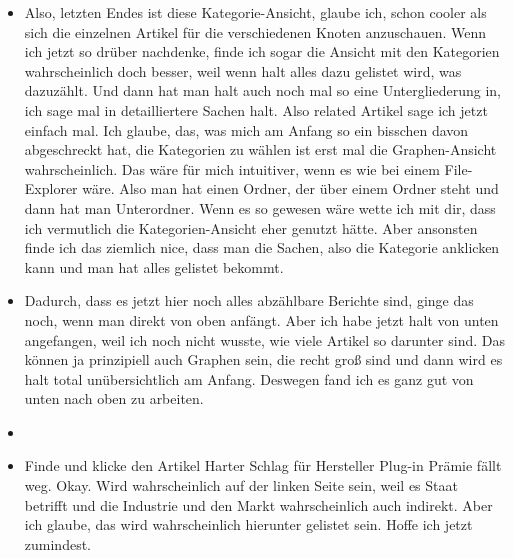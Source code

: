 {\begin{itemize}[]
                  Also, dass du beschrieben hast, dass du eher diese Bottom-to-Top-Ansicht bevorzugst, also, dass du eher auf die Artikel klickst.
                  Später hast du dann aber auch die Top-to-Bottom-Ansicht ausprobiert.
                  Kannst du mir dazu vielleicht noch etwas erzählen?
            \item {} Also, letzten Endes ist diese Kategorie-Ansicht, glaube ich, schon cooler als sich die einzelnen Artikel für die verschiedenen Knoten anzuschauen.
                  Wenn ich jetzt so drüber nachdenke, finde ich sogar die Ansicht mit den Kategorien wahrscheinlich doch besser, weil wenn halt alles dazu gelistet wird, was dazuzählt.
                  Und dann hat man halt auch noch mal so eine Untergliederung in, ich sage mal in detailliertere Sachen halt. Also related Artikel sage ich jetzt einfach mal.
                  Ich glaube, das, was mich am Anfang so ein bisschen davon abgeschreckt hat, die Kategorien zu wählen ist erst mal die Graphen-Ansicht wahrscheinlich.
                  Das wäre für mich intuitiver, wenn es wie bei einem File-Explorer wäre.
                  Also man hat einen Ordner, der über einem Ordner steht und dann hat man Unterordner.
                  Wenn es so gewesen wäre wette ich mit dir, dass ich vermutlich die Kategorien-Ansicht eher genutzt hätte.
                  Aber ansonsten finde ich das ziemlich nice, dass man die Sachen, also die Kategorie anklicken kann und man hat alles gelistet bekommt.
            \item {} Dadurch, dass es jetzt hier noch alles abzählbare Berichte sind, ginge das noch, wenn man direkt von oben anfängt.
                  Aber ich habe jetzt halt von unten angefangen, weil ich noch nicht wusste, wie viele Artikel so darunter sind.
                  Das können ja prinzipiell auch Graphen sein, die recht groß sind und dann wird es halt total unübersichtlich am Anfang.
                  Deswegen fand ich es ganz gut von unten nach oben zu arbeiten.
            \item {}
            \item {} Finde und klicke den Artikel \flqq Harter Schlag für Hersteller Plug-in Prämie fällt weg\frqq{}.
                  Okay. Wird wahrscheinlich auf der linken Seite sein, weil es Staat betrifft und die Industrie und den Markt wahrscheinlich auch indirekt.
                  Aber ich glaube, das wird wahrscheinlich hierunter gelistet sein.
                  Hoffe ich jetzt zumindest.

\end{itemize}}

